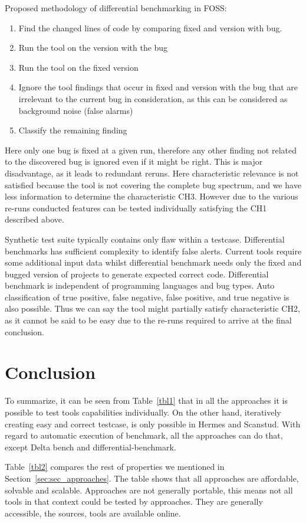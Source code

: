 \documentclass[authoryear,preprint]{sigplanconf}
\begin{document}
Proposed methodology of differential benchmarking in FOSS:
\begin{enumerate}
	\item Find the changed lines of code by comparing fixed and version with bug.
	\item Run the tool on the version with the bug
	\item Run the tool on the fixed version
	\item Ignore the tool findings that occur in fixed and version with the bug that are irrelevant to the current bug in consideration, as this can be considered as background noise (false alarms)
	\item Classify the remaining finding
\end{enumerate}

Here only one bug is fixed at a given run, therefore any other finding not related to the discovered bug is ignored even if it might be right. This is major disadvantage, as it leads to redundant reruns. Here characteristic relevance is not satisfied because the tool is not covering the complete bug spectrum, and we have less information to determine the characteristic CH3. However due to the various re-runs conducted features can be tested individually satisfying the CH1 described above.

Synthetic test suite typically contains only flaw within a testcase. Differential benchmarks has sufficient complexity to identify false alerts. Current tools require some additional input data whilst differential benchmark needs only the fixed and bugged version of projects to generate expected correct code. Differential benchmark is independent of programming languages and bug types. Auto classification of true positive, false negative, false positive, and true negative is also possible. Thus we can say the tool might partially satisfy characteristic CH2, as it cannot be said to be easy due to the re-runs required to arrive at the final conclusion.

\section{Conclusion}
\label{sec:conclusion}
To summarize, it can be seen from Table~\ref{tbl1} that in all the approaches it is possible to test tools capabilities individually. On the other hand, iteratively creating easy and correct testcase, is only possible in Hermes and Scanstud. With regard to automatic execution of benchmark, all the approaches can do that, except Delta bench and differential-benchmark.

Table~\ref{tbl2} compares the rest of properties we mentioned in Section~\ref{sec:sec_approaches}. The table shows that all approaches are affordable, solvable and scalable. Approaches are not generally portable, this means not all tools in that context could be tested by approaches. They are generally accessible, the sources, tools are available online.  
 
	
	
	
	
\end{document}
